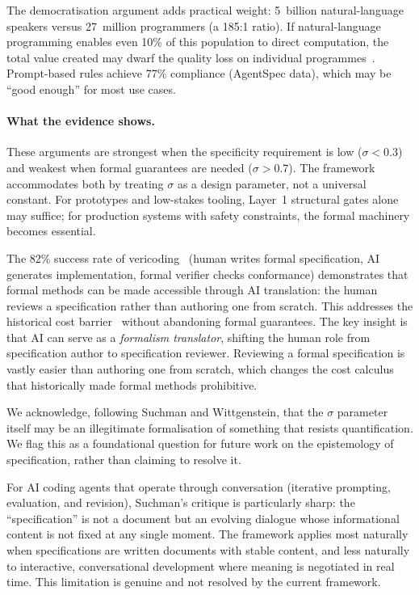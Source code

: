 \documentclass[11pt, a4paper]{googledeepmind}
\begin{document}
The democratisation argument adds practical weight: 5~billion natural-language
speakers versus 27~million programmers (a 185:1 ratio).  If natural-language
programming enables even 10\% of this population to direct computation, the
total value created may dwarf the quality loss on individual
programmes~\citep{litt2023malleable, altman2024intelligence}.  Prompt-based
rules achieve 77\% compliance (AgentSpec data), which may be ``good enough''
for most use cases.

\paragraph{What the evidence shows.}
These arguments are strongest when the specificity requirement is low
($\sigma < 0.3$) and weakest when formal guarantees are needed
($\sigma > 0.7$).  The framework accommodates both by treating $\sigma$ as a
design parameter, not a universal constant.  For prototypes and low-stakes
tooling, Layer~1 structural gates alone may suffice; for production systems with
safety constraints, the formal machinery becomes essential.

The 82\% success rate of vericoding~\citep{vericoding2025} (human writes formal
specification, AI generates implementation, formal verifier checks conformance)
demonstrates that formal methods can be made accessible through AI translation:
the human reviews a specification rather than authoring one from scratch.  This
addresses the historical cost barrier~\citep{kleppmann2025formal} without
abandoning formal guarantees.  The key insight is that AI can serve as a
\emph{formalism translator}, shifting the human role from specification author
to specification reviewer.  Reviewing a formal specification is vastly easier
than authoring one from scratch, which changes the cost calculus that
historically made formal methods prohibitive.

We acknowledge, following Suchman and Wittgenstein, that the $\sigma$ parameter
itself may be an illegitimate formalisation of something that resists
quantification.  We flag this as a foundational question for future work on the
epistemology of specification, rather than claiming to resolve it.

For AI coding agents that operate through conversation (iterative prompting,
evaluation, and revision), Suchman's critique is particularly sharp: the
``specification'' is not a document but an evolving dialogue whose informational
content is not fixed at any single moment.  The framework applies most naturally
when specifications are written documents with stable content, and less
naturally to interactive, conversational development where meaning is negotiated
in real time.  This limitation is genuine and not resolved by the current
framework.
\end{document}
